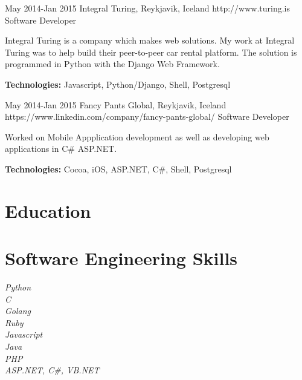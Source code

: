 \documentclass[10pt]{article} %
\begin{document}

\job
{May 2014-}{Jan 2015}
{Integral Turing, Reykjavik, Iceland}
{http://www.turing.is}
{Software Developer}
{Integral Turing is a company which makes web solutions. My work at Integral Turing was to help build their peer-to-peer car rental platform.
The solution is programmed in Python with the Django Web Framework.\\
\rule{0mm}{5mm}\textbf{Technologies:} Javascript, Python/Django, Shell, Postgresql}


\job
{May 2014-}{Jan 2015}
{Fancy Pants Global, Reykjavik, Iceland}
{https://www.linkedin.com/company/fancy-pants-global/}
{Software Developer}
{Worked on Mobile Appplication development as well as developing web applications in C\# ASP.NET. \\
\rule{0mm}{5mm}\textbf{Technologies:} Cocoa, iOS, ASP.NET, C\#, Shell, Postgresql}


\section{Education}



\section{Software Engineering Skills}

{
\textit{Python}\\
\textit{C}\\
\textit{Golang}\\
\textit{Ruby}\\
\textit{Javascript}\\
\textit{Java}\\
\textit{PHP}\\
\textit{ASP.NET, C\#, VB.NET}
}
\end{document}
